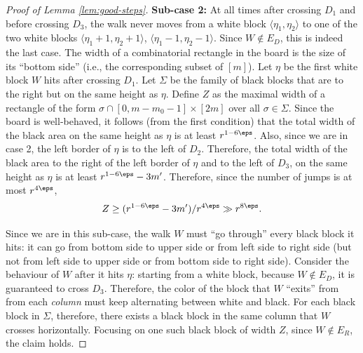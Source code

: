 \documentclass{article}
\begin{document}
\begin{proof}[Proof of Lemma \ref{lem:good-steps}]
\textbf{Sub-case 2:} At all times after crossing $D_1$ and before crossing $D_3$, the walk never moves from a
white block $\langle \eta_1, \eta_2 \rangle$ to one of the two white blocks $\langle\eta_1 + 1, \eta_2 + 1\rangle$, $\langle \eta_1 - 1, \eta_2 - 1\rangle$. Since $W \notin E_D$,
this is indeed the last case. The width of a combinatorial rectangle in the board is the size of its
“bottom side” (i.e., the corresponding subset of $[m]$). Let $\eta$ be the first white block $W$ hits after
crossing $D_1$. Let $\Sigma$ be the family of black blocks that are to the right but on the same height as $\eta$.
Define $Z$ as the maximal width of a rectangle of the form $\sigma \cap [0, m - m_0 - 1] \times [2m]$ over all $\sigma \in \Sigma$.
Since the board is well-behaved, it follows (from the first condition) that the
total width of the black area on the same height as $\eta$ is at least $r^{1-6\eps}$. Also, since we are in case 2, the left border of $\eta$ is to the left of $D_2$. Therefore, the
total width of the black area to the right of the left border of $\eta$ and to the
left of $D_3$, on the same height as $\eta$ is at least $r^{1-6\eps}- 3m'$. Therefore, since the number of jumps is at most $r^{4\eps}$,
\[
Z\geq (r^{1-6\eps}- 3m')/r^{4\eps} \gg r^{8\eps}.
\]

Since we are in this sub-case, the walk $W$ must “go through” every black block it hits: it can go from
bottom side to upper side or from left side to right side (but not from left side to upper side or
from bottom side to right side). Consider the behaviour of $W$ after it hits $\eta$: starting from a white block, because $W \notin E_D$, it is guaranteed to cross $D_3$. Therefore, the color of the block that $W$ ``exits'' from from each \emph{column} must keep alternating between white and black. For each black block in $\Sigma$, therefore, there exists
a black block in the same column that $W$ crosses horizontally. Focusing on one such black block
of width $Z$, since $W \notin E_R$, the claim holds.
\end{proof}
\end{document}
